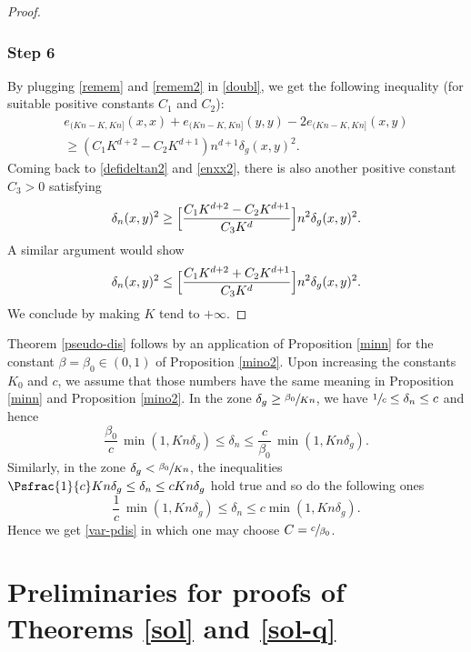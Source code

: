 \begin{proof}
\subsubsection*{Step 6} By plugging \eqref{remem} and \eqref{remem2} in \eqref{doubl}, we get the following inequality (for suitable positive constants $C_1$ and $C_2$):
\begin{multline*}
e_{(Kn-K,Kn]}(x,x)+e_{(Kn-K,Kn]}(y,y)-2e_{(Kn-K,Kn]}(x,y)\\
\geq (C_1 K^{d+2}-C_2 K^{d+1})n^{d+1}\delta_g(x,y)^2.
\end{multline*}
Coming back to \eqref{defideltan2} and \eqref{enxx2}, there is also another positive constant $C_3>0$ satisfying
\begin{equation*}
\delta_n(x,y)^2 \geq \Bigl[\frac{C_1 K^{d+2}-C_2 K^{d+1}}{C_3 K^d} \Bigr]n^2 \delta_g(x,y)^2.
\end{equation*}
A similar argument would show
\begin{equation*}
\delta_n(x,y)^2\leq \Bigl[\frac{C_1 K^{d+2}+C_2 K^{d+1}}{C_3 K^d} \Bigr]n^2 \delta_g(x,y)^2.
\end{equation*}
We conclude by making $K$ tend to $+\infty$.
\end{proof}

Theorem \ref{pseudo-dis} follows by an application of Proposition \ref{minn} for the constant $\beta=\beta_0\in (0,1)$ of Proposition \ref{mino2}. Upon increasing the constants $K_0$ and $c$, we assume that those numbers have the same meaning in
Proposition \ref{minn} and Proposition \ref{mino2}. In the zone $\delta_g\geq \sfrac{\beta_0}{Kn}$, we have
$\sfrac{1}{c} \leq \delta_n \leq c$ and hence
\[
\frac{\beta_0}{c}\,\min(1,Kn\delta_g)\leq \delta_n \leq\frac{c}{\beta_0}\,\min(1,Kn\delta_g).
\]
Similarly, in the zone $\delta_g<\sfrac{\beta_0}{Kn}$, the inequalities
$\Psfrac{1}{c}Kn\delta_g \leq \delta_n\leq c Kn\delta_g$ hold true and so do the following ones
\[
\frac{1}{c}\,\min(1,Kn\delta_g)\leq \delta_n \leq c \min(1,Kn\delta_g).
\]
Hence we get \eqref{var-pdis} in which one may choose $C=\sfrac{c}{\beta_0}$.

\section{Preliminaries for proofs of Theorems \ref{sol} and \ref{sol-q}}\label{s-p2}

